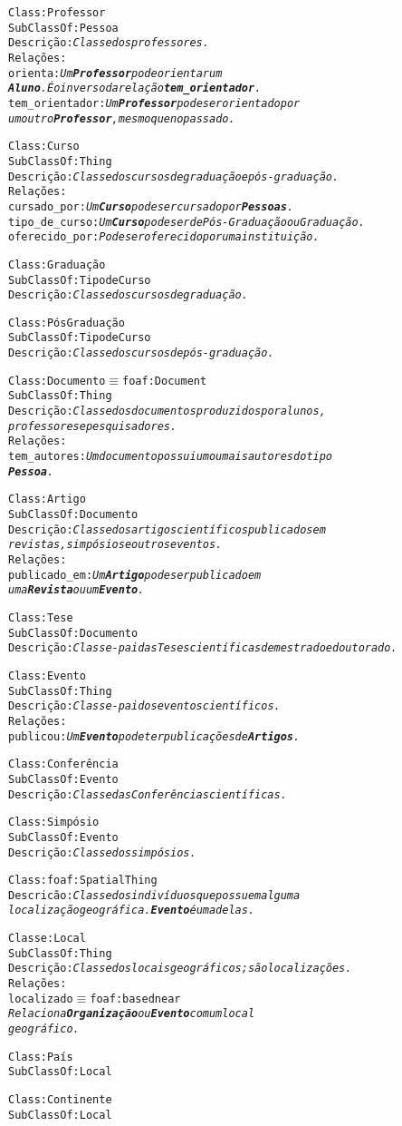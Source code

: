 \begin{alltt}
Class: Professor
SubClassOf: Pessoa
Descrição: \emph{Classe dos professores.}
Relações:
orienta: \emph{Um \textbf{Professor} pode orientar um
\textbf{Aluno}. É o inverso da relação \textbf{tem_orientador}.}
tem_orientador: \emph{Um \textbf{Professor} pode ser orientado por
um outro \textbf{Professor}, mesmo que no passado.}

Class: Curso
SubClassOf: Thing
Descrição: \emph{Classe dos cursos de graduação e pós-graduação.}
Relações:
cursado_por: \emph{Um \textbf{Curso} pode ser cursado por \textbf{Pessoas}.}
tipo_de_curso: \emph{Um \textbf{Curso} pode ser de Pós-Graduação ou Graduação.}
oferecido_por: \emph{Pode ser oferecido por uma instituição.}

Class: Graduação
SubClassOf: Tipo de Curso
Descrição: \emph{Classe dos cursos de graduação.}

Class: Pós Graduação
SubClassOf: Tipo de Curso
Descrição: \emph{Classe dos cursos de pós-graduação.}

Class: Documento \( \equiv \) foaf:Document
SubClassOf: Thing
Descrição: \emph{Classe dos documentos produzidos por alunos,
professores e pesquisadores.}
Relações:
tem_autores: \emph{Um documento possui um ou mais autores do tipo
\textbf{Pessoa}.}

Class: Artigo
SubClassOf: Documento
Descrição: \emph{Classe dos artigos científicos publicados em
revistas, simpósios e outros eventos.}
Relações:
publicado_em: \emph{Um \textbf{Artigo} pode ser publicado em
uma \textbf{Revista} ou um \textbf{Evento}.}

Class: Tese
SubClassOf: Documento
Descrição: \emph{Classe-pai das Teses científicas de mestrado e doutorado.}

Class: Evento
SubClassOf: Thing
Descrição: \emph{Classe-pai dos eventos científicos.}
Relações:
publicou: \emph{Um \textbf{Evento} pode ter publicações de \textbf{Artigos}.}

Class: Conferência
SubClassOf: Evento
Descrição: \emph{Classe das Conferências científicas.}

Class: Simpósio
SubClassOf: Evento
Descrição: \emph{Classe dos simpósios.}

Class: foaf:Spatial Thing
Descricão: \emph{Classe dos indivíduos que possuem alguma
localização geográfica. \textbf{Evento} é uma delas.}

Classe: Local
SubClassOf: Thing
Descrição: \emph{Classe dos locais geográficos; são localizações.}
Relações:
localizado \( \equiv \) foaf:based near
\emph{Relaciona \textbf{Organização} ou \textbf{Evento} com um local
geográfico.}

Class: País
SubClassOf: Local

Class: Continente
SubClassOf: Local

\end{alltt}



